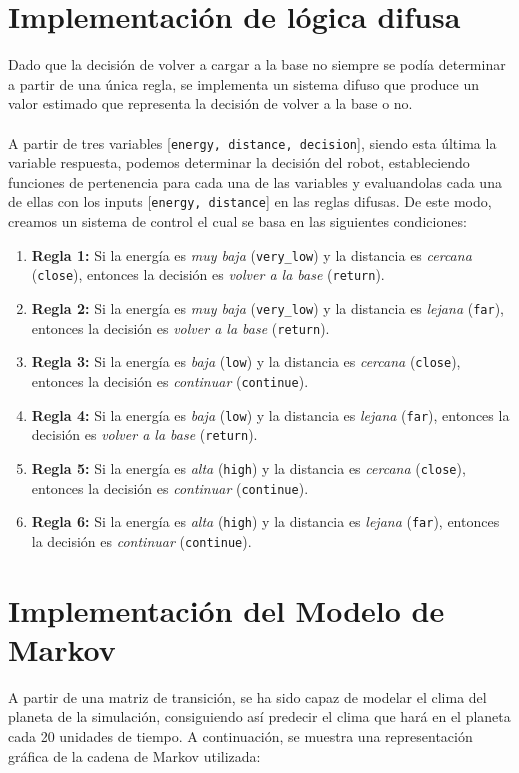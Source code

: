 \documentclass[a4paper,12pt]{article}
\begin{document}
\section{Implementación de lógica difusa}
Dado que la decisión de volver a cargar a la base no siempre se podía determinar a partir de una única regla, se implementa un sistema difuso que produce un valor estimado que representa la decisión de volver a la base o no.
\\\\
A partir de tres variables [\texttt{energy, distance, decision}], siendo esta última la variable respuesta, podemos determinar la decisión del robot, estableciendo funciones de pertenencia para cada una de las variables y evaluandolas cada una de ellas con los inputs [\texttt{energy, distance}] en las reglas difusas. De este modo, creamos un sistema de control el cual se basa en las siguientes condiciones:
\begin{enumerate}
    \item \textbf{Regla 1:} Si la energía es \textit{muy baja} (\texttt{very\_low}) y la distancia es \textit{cercana} (\texttt{close}), entonces la decisión es \textit{volver a la base} (\texttt{return}).
    \item \textbf{Regla 2:} Si la energía es \textit{muy baja} (\texttt{very\_low}) y la distancia es \textit{lejana} (\texttt{far}), entonces la decisión es \textit{volver a la base} (\texttt{return}).
    \item \textbf{Regla 3:} Si la energía es \textit{baja} (\texttt{low}) y la distancia es \textit{cercana} (\texttt{close}), entonces la decisión es \textit{continuar} (\texttt{continue}).
    \item \textbf{Regla 4:} Si la energía es \textit{baja} (\texttt{low}) y la distancia es \textit{lejana} (\texttt{far}), entonces la decisión es \textit{volver a la base} (\texttt{return}).
    \item \textbf{Regla 5:} Si la energía es \textit{alta} (\texttt{high}) y la distancia es \textit{cercana} (\texttt{close}), entonces la decisión es \textit{continuar} (\texttt{continue}).
    \item \textbf{Regla 6:} Si la energía es \textit{alta} (\texttt{high}) y la distancia es \textit{lejana} (\texttt{far}), entonces la decisión es \textit{continuar} (\texttt{continue}).
\end{enumerate}

\section{Implementación del Modelo de Markov}
A partir de una matriz de transición, se ha sido capaz de modelar el clima del planeta de la simulación, consiguiendo así predecir el clima que hará en el planeta cada 20 unidades de tiempo. A continuación, se muestra una representación gráfica de la cadena de Markov utilizada:
\end{document}
